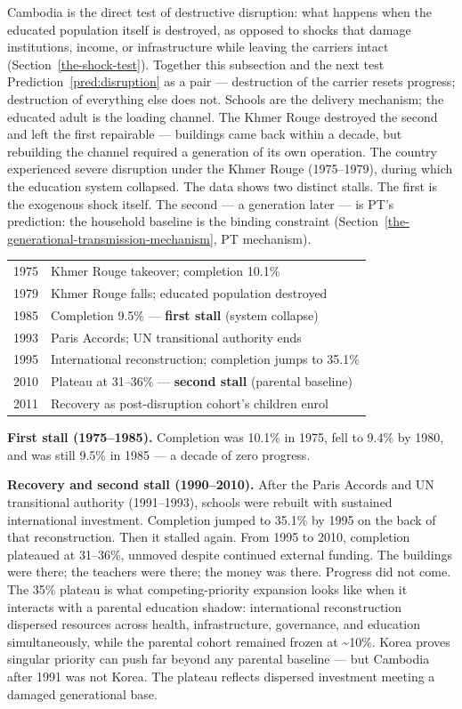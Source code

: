 \documentclass[12pt,letterpaper]{article}
\begin{document}
Cambodia is the direct test of destructive disruption: what happens
when the educated population itself is destroyed, as opposed to
shocks that damage institutions, income, or infrastructure while
leaving the carriers intact (Section~\ref{the-shock-test}). Together
this subsection and the next test
Prediction~\ref{pred:disruption} as a pair --- destruction of the
carrier resets progress; destruction of everything else does not. Schools are the
delivery mechanism; the educated adult is the loading channel. The
Khmer Rouge destroyed the second and left the first repairable ---
buildings came back within a decade, but rebuilding the channel
required a generation of its own operation. The country experienced
severe disruption under the Khmer Rouge (1975--1979), during which
the education system collapsed. The
data shows two distinct stalls. The first is the exogenous shock itself.
The second --- a generation later --- is PT's prediction: the
household baseline is the binding constraint (Section~\ref{the-generational-transmission-mechanism}, PT mechanism).

\begin{center}
\small
\begin{tabular}{@{}ll@{}}
\toprule
1975 & Khmer Rouge takeover; completion 10.1\% \\
1979 & Khmer Rouge falls; educated population destroyed \\
1985 & Completion 9.5\% --- \textbf{first stall} (system collapse) \\
1993 & Paris Accords; UN transitional authority ends \\
1995 & International reconstruction; completion jumps to 35.1\% \\
2010 & Plateau at 31--36\% --- \textbf{second stall} (parental baseline) \\
2011 & Recovery as post-disruption cohort's children enrol \\
\bottomrule
\end{tabular}
\end{center}

\textbf{First stall (1975--1985).} Completion was 10.1\% in 1975, fell to 9.4\% by 1980, and was still 9.5\% in 1985 --- a decade of zero progress.

\textbf{Recovery and second stall (1990--2010).} After the Paris Accords
and UN transitional authority (1991--1993), schools were rebuilt with
sustained international investment. Completion jumped to 35.1\% by 1995
on the back of that reconstruction. Then it stalled again. From 1995 to
2010, completion plateaued at 31--36\%, unmoved despite continued
external funding. The buildings were there; the teachers were there; the
money was there. Progress did not come. The 35\% plateau is what
competing-priority expansion looks like when it interacts with a
parental education shadow: international reconstruction dispersed
resources across health, infrastructure, governance, and education
simultaneously, while the parental cohort remained frozen at
\textasciitilde10\%. Korea proves singular priority can push far beyond
any parental baseline --- but Cambodia after 1991 was not Korea. The
plateau reflects dispersed investment meeting a damaged generational
base.
\end{document}
